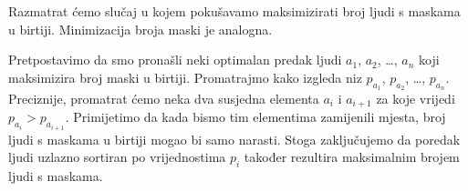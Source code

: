 \documentclass[a4paper]{article}
\begin{document}
Razmatrat ćemo slučaj u kojem pokušavamo maksimizirati broj ljudi s maskama
u birtiji. Minimizacija broja maski je analogna.

Pretpostavimo da smo pronašli neki optimalan predak ljudi $a_1$, $a_2$, \ldots,
$a_n$ koji maksimizira broj maski u birtiji. Promatrajmo kako izgleda niz
$p_{a_1}$, $p_{a_2}$, \ldots, $p_{a_n}$. Preciznije, promatrat ćemo neka dva
susjedna elementa $a_i$ i $a_{i+1}$ za koje vrijedi $p_{a_i} > p_{a_{i+1}}$.
Primijetimo da kada bismo tim elementima zamijenili mjesta, broj ljudi s
maskama u birtiji mogao bi samo narasti. Stoga zaključujemo da poredak ljudi
uzlazno sortiran po vrijednostima $p_i$ također rezultira maksimalnim brojem
ljudi s maskama.
\end{document}
